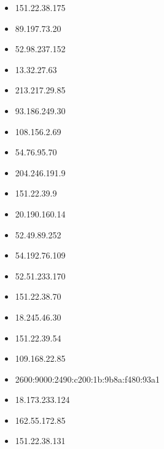 \documentclass{article}
\begin{document}
\begin{itemize}
            \item 151.22.38.175
        
            \item 89.197.73.20
        
            \item 52.98.237.152
        
            \item 13.32.27.63
        
            \item 213.217.29.85
        
            \item 93.186.249.30
        
            \item 108.156.2.69
        
            \item 54.76.95.70
        
            \item 204.246.191.9
        
            \item 151.22.39.9
        
            \item 20.190.160.14
        
            \item 52.49.89.252
        
            \item 54.192.76.109
        
            \item 52.51.233.170
        
            \item 151.22.38.70
        
            \item 18.245.46.30
        
            \item 151.22.39.54
        
            \item 109.168.22.85
        
            \item 2600:9000:2490:c200:1b:9b8a:f480:93a1
        
            \item 18.173.233.124
        
            \item 162.55.172.85
        
            \item 151.22.38.131
        

\end{itemize}
\end{document}
